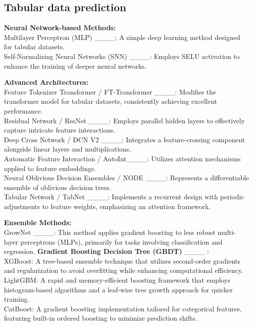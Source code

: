 \subsection{Tabular data prediction}
\textbf{Neural Network-based Methods:}\\
    Multilayer Perceptron (MLP) ____: A simple deep learning method designed for tabular datasets. \\ 
    Self-Normalizing Neural Networks (SNN)  ____: Employs SELU activation to enhance the training of deeper neural networks.

\textbf{Advanced Architectures:}\\
Feature Tokenizer Transformer / FT-Transformer ____: Modifies the transformer model for tabular datasets, consistently achieving excellent performance.  \\
Residual Network / ResNet ____: Employs parallel hidden layers to effectively capture intricate feature interactions.  \\
Deep Cross Network / DCN V2 ____: Integrates a feature-crossing component alongside linear layers and multiplications.  \\
Automatic Feature Interaction / AutoInt____: Utilizes attention mechanisms applied to feature embeddings.  \\
Neural Oblivious Decision Ensembles / NODE ____: Represents a differentiable ensemble of oblivious decision trees.  \\
Tabular Network / TabNet ____: Implements a recurrent design with periodic adjustments to feature weights, emphasizing an attention framework.

\textbf{Ensemble Methods:}\\
   GrowNet ____: This method applies gradient boosting to less robust multi-layer perceptrons (MLPs), primarily for tasks involving classification and regression.
\textbf{Gradient Boosting Decision Tree (GBDT) } ____ : \\
    XGBoost: A tree-based ensemble technique that utilizes second-order gradients and regularization to avoid overfitting while enhancing computational efficiency.\\
    LightGBM: A rapid and memory-efficient boosting framework that employs histogram-based algorithms and a leaf-wise tree growth approach for quicker training.\\
    CatBoost: A gradient boosting implementation tailored for categorical features, featuring built-in ordered boosting to minimize prediction shifts.

